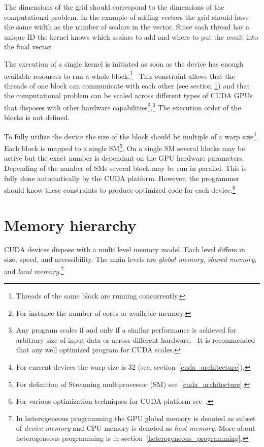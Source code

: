\documentclass[12pt,oneside]{fithesis2}
\begin{document}
The dimensions of the grid should correspond to the dimensions of the computational problem. In the example of adding vectors the grid should have the same width as the number of scalars in the vector. Since each thread has a unique ID the kernel knows which scalars to add and where to put the result into the final vector.

The execution of a single kernel is initiated as soon as the device has enough available resources to run a whole block.\footnote{Threads of the same block are running concurrently.}~\cite{cuda_guide} This constraint allows that the threads of one block can communicate with each other (see section \ref{memory_hiearchy}) and that the computational problem can be scaled across different types of CUDA GPUs that disposes with other hardware capabilities\footnote{For instance the number of cores or available memory.}.\footnote{Any program scales if and only if a similar performance is achieved for arbitrary size of input data or across different hardware.~\cite{cuda_best_practices} It is recommended that any well optimized program for CUDA scales.} The execution order of the blocks is not defined.

To fully utilize the device the size of the block should be multiple of a warp size\footnote{For current devices the warp size is 32 (see. section~\ref{cuda_architecture}).}. Each block is mapped to a single SM\footnote{For definition of Streaming multiprocessor (SM) see~\ref{cuda_architecture}.}. On a single SM several blocks may be active but the exact number is dependant on the GPU hardware parameters. Depending of the number of SMs several block may be run in parallel. This is fully done automatically by the CUDA platform. However, the programmer should know these constraints to produce optimized code for each device.\footnote{For various optimization techniques for CUDA platform see~\cite{cuda_best_practices}.}

\section{Memory hierarchy}
\label{memory_hiearchy}

CUDA devices dispose with a multi level memory model. Each level differs in size, speed, and accessibility. The main levels are \emph{global memory}, \emph{shared memory}, and \emph{local memory}.\footnote{In heterogeneous programming the GPU global memory is denoted as subset of \emph{device memory} and CPU memory is denoted as \emph{host memory}. More about heterogeneous programming is in section~\ref{heterogeneous_programming}.}~\cite{cuda_guide}
\end{document}
